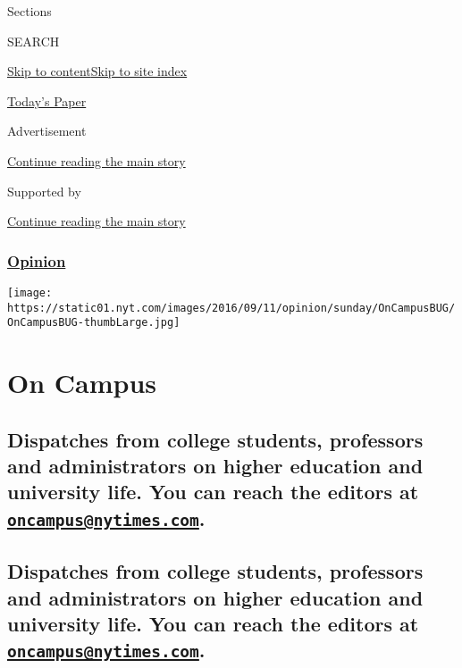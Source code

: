 Sections

SEARCH

\protect\hyperlink{site-content}{Skip to
content}\protect\hyperlink{site-index}{Skip to site index}

\href{https://myaccount.nytimes.com/auth/login?response_type=cookie\&client_id=vi}{}

\href{https://www.nytimes.com/section/todayspaper}{Today's Paper}

Advertisement

\protect\hyperlink{after-top}{Continue reading the main story}

Supported by

\protect\hyperlink{after-sponsor}{Continue reading the main story}

\hypertarget{opinion}{%
\subsubsection{\texorpdfstring{\href{/section/opinion}{Opinion}}{Opinion}}\label{opinion}}

\texttt{[image: https://static01.nyt.com/images/2016/09/11/opinion/sunday/OnCampusBUG/OnCampusBUG-thumbLarge.jpg]}

\hypertarget{on-campus}{%
\section{On Campus}\label{on-campus}}

\hypertarget{dispatches-from-college-students-professors-and-administrators-on-higher-education-and-university-life-you-can-reach-the-editors-at-oncampusnytimescom}{%
\subsection{\texorpdfstring{Dispatches from college students, professors
and administrators on higher education and university life. You can
reach the editors at
\href{mailto:oncampus@nytimes.com}{\nolinkurl{oncampus@nytimes.com}}.}{Dispatches from college students, professors and administrators on higher education and university life. You can reach the editors at oncampus@nytimes.com.}}\label{dispatches-from-college-students-professors-and-administrators-on-higher-education-and-university-life-you-can-reach-the-editors-at-oncampusnytimescom}}

\hypertarget{dispatches-from-college-students-professors-and-administrators-on-higher-education-and-university-life-you-can-reach-the-editors-at-oncampusnytimescom-1}{%
\subsection{\texorpdfstring{Dispatches from college students, professors
and administrators on higher education and university life. You can
reach the editors at
\href{mailto:oncampus@nytimes.com}{\nolinkurl{oncampus@nytimes.com}}.}{Dispatches from college students, professors and administrators on higher education and university life. You can reach the editors at oncampus@nytimes.com.}}\label{dispatches-from-college-students-professors-and-administrators-on-higher-education-and-university-life-you-can-reach-the-editors-at-oncampusnytimescom-1}}

